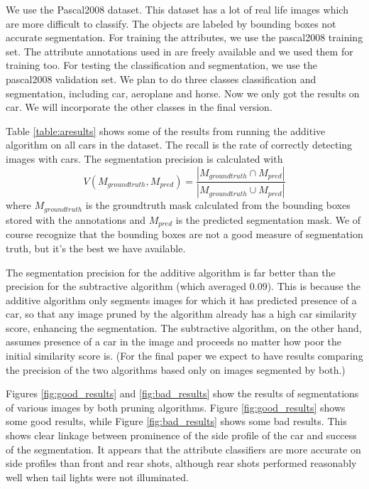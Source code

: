 \documentclass[10pt,twocolumn,letterpaper]{article}
\begin{document}

We use the Pascal2008 dataset. This dataset has a lot of real life
images which are more difficult to classify. The objects are labeled
by bounding boxes not accurate segmentation. For training the
attributes, we use the pascal2008 training set. The attribute
annotations used in \cite{farhadi09} are freely available and we
used them for training too. For testing the classification and
segmentation, we use the pascal2008 validation set. We plan to do
three classes classification and segmentation, including car,
aeroplane and horse. Now we only got the results on car. We will
incorporate the other classes in the final version.

Table \ref{table:aresults} shows some of the results from running
the additive algorithm on all cars in the dataset.  The recall is
the rate of correctly detecting images with cars.  The segmentation
precision is calculated with
\[ V(M_{groundtruth},M_{pred}) = \frac{|M_{groundtruth} \cap M_{pred}|}{|M_{groundtruth} \cup M_{pred}|} \]
where $M_{groundtruth}$ is the groundtruth mask calculated from the
bounding boxes stored with the annotations and $M_{pred}$ is the
predicted segmentation mask.  We of course recognize that the
bounding boxes are not a good measure of segmentation truth, but
it's the best we have available.

The segmentation precision for the additive algorithm
is far better than the precision for the subtractive algorithm (which averaged
0.09).  This is because the additive algorithm only segments images for
which it has predicted presence of a car, so that any image pruned by the
algorithm already has a high car similarity score, enhancing the segmentation.
The subtractive algorithm, on the other hand, assumes presence of a car in
the image and proceeds no matter how poor the initial similarity score is.
(For the final paper we expect to have results comparing the precision
of the two algorithms based only on images segmented by both.)

Figures \ref{fig:good_results} and \ref{fig:bad_results} show the
results of segmentations of various images by both pruning
algorithms. Figure \ref{fig:good_results} shows some good results,
while Figure \ref{fig:bad_results} shows some bad results. This
shows clear linkage between prominence of the side profile of the
car and success of the segmentation. It appears that the attribute
classifiers are more accurate on side profiles than front and rear
shots, although rear shots performed reasonably well when tail
lights were not illuminated.
\end{document}
